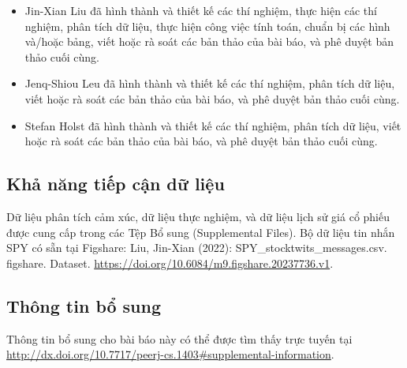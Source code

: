 \begin{itemize}
  \item Jin-Xian Liu đã hình thành và thiết kế các thí nghiệm, thực hiện các thí nghiệm, phân tích dữ liệu, thực hiện công việc tính toán, chuẩn bị các hình và/hoặc bảng, viết hoặc rà soát các bản thảo của bài báo, và phê duyệt bản thảo cuối cùng.
  \item Jenq-Shiou Leu đã hình thành và thiết kế các thí nghiệm, phân tích dữ liệu, viết hoặc rà soát các bản thảo của bài báo, và phê duyệt bản thảo cuối cùng.
  \item Stefan Holst đã hình thành và thiết kế các thí nghiệm, phân tích dữ liệu, viết hoặc rà soát các bản thảo của bài báo, và phê duyệt bản thảo cuối cùng.
\end{itemize}

\subsection*{Khả năng tiếp cận dữ liệu}

Dữ liệu phân tích cảm xúc, dữ liệu thực nghiệm, và dữ liệu lịch sử giá cổ phiếu được cung cấp trong các Tệp Bổ sung (Supplemental Files). Bộ dữ liệu tin nhắn SPY có sẵn tại Figshare: Liu, Jin-Xian (2022): SPY\_stocktwits\_messages.csv. figshare. Dataset. \url{https://doi.org/10.6084/m9.figshare.20237736.v1}.

\subsection*{Thông tin bổ sung}

Thông tin bổ sung cho bài báo này có thể được tìm thấy trực tuyến tại \url{http://dx.doi.org/10.7717/peerj-cs.1403#supplemental-information}.

